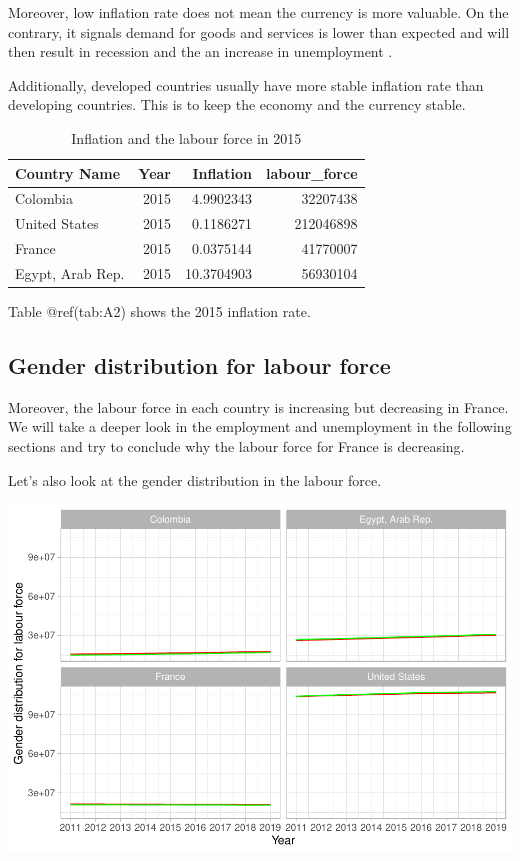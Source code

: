 \documentclass[
]{article}
\begin{document}
Moreover, low inflation rate does not mean the currency is more
valuable. On the contrary, it signals demand for goods and services is
lower than expected and will then result in recession and the an
increase in unemployment \autocite{inflation2}.

Additionally, developed countries usually have more stable inflation
rate than developing countries. This is to keep the economy and the
currency stable.

\begin{table}

\caption{\label{tab:A2}Inflation and the labour force in 2015}
\centering
\begin{tabular}[t]{l|r|r|r}
\hline
Country Name & Year & Inflation & labour\_force\\
\hline
Colombia & 2015 & 4.9902343 & 32207438\\
\hline
United States & 2015 & 0.1186271 & 212046898\\
\hline
France & 2015 & 0.0375144 & 41770007\\
\hline
Egypt, Arab Rep. & 2015 & 10.3704903 & 56930104\\
\hline
\end{tabular}
\end{table}

Table @ref(tab:A2) shows the 2015 inflation rate.

\hypertarget{gender-distribution-for-labour-force}{%
\subsection{Gender distribution for labour
force}\label{gender-distribution-for-labour-force}}

Moreover, the labour force in each country is increasing but decreasing
in France. We will take a deeper look in the employment and unemployment
in the following sections and try to conclude why the labour force for
France is decreasing.

Let's also look at the gender distribution in the labour force.

\includegraphics{The_Outsiders_5513_files/figure-latex/A3-1.pdf}
\end{document}
